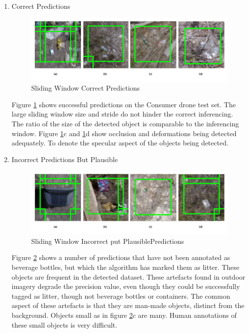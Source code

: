 \documentclass{article}
\begin{document}
\begin{enumerate}
\item Correct Predictions
\begin{figure}[H]
\centering
\label{fig:test1correct}
\includegraphics[scale=0.4]{images/test1-correct.png}
\caption{Sliding Window Correct Predictions}
\end{figure}

Figure \ref{fig:test1correct} shows successful predictions on the Consumer drone test set. The large sliding window size and stride do not hinder the correct inferencing. The ratio of the size of the detected object is comparable to the inferencing window. Figure \ref{fig:test1correct}c and \ref{fig:test1correct}d show occlusion and deformations being detected adequately. To denote the specular aspect of the objects being detected.

\item Incorrect Predictions But Plausible
\begin{figure}[H]
\centering
\label{fig:test1plausible}
\includegraphics[scale=0.4]{images/test1-plausible.png}
\caption{Sliding Window Incorrect put PlausiblePredictions}
\end{figure}

Figure \ref{fig:test1plausible} shows a number of predictions that have not been annotated as beverage bottles, but which the algorithm has marked them as litter. These objects are frequent in the detected dataset. These artefacts found in outdoor imagery degrade the precision value, even though they could be successfully tagged as litter, though not beverage bottles or containers. The common aspect of these artefacts is that they are man-made objects, distinct from the background. Objects small as in figure \ref{fig:test1plausible}c are many. Human annotations of these small objects is very difficult.


\end{enumerate}
\end{document}
